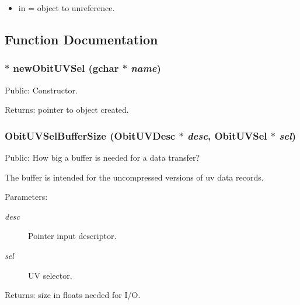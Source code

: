 \begin{itemize}
\item in = object to unreference. \end{itemize}


\subsection{Function Documentation}
\subsubsection{$\ast$ new\-Obit\-UVSel (gchar $\ast$ {\em name})}\label{ObitUVSel_8h_a4}


Public: Constructor. 

\begin{Desc}
\item[Returns:]pointer to object created. \end{Desc}
\subsubsection{ Obit\-UVSel\-Buffer\-Size ({\bf Obit\-UVDesc} $\ast$ {\em desc}, {\bf Obit\-UVSel} $\ast$ {\em sel})}\label{ObitUVSel_8h_a7}


Public: How big a buffer is needed for a data transfer? 

The buffer is intended for the uncompressed versions of uv data records. \begin{Desc}
\item[Parameters:]
\begin{description}
\item[{\em desc}]Pointer input descriptor. \item[{\em sel}]UV selector. \end{description}
\end{Desc}
\begin{Desc}
\item[Returns:]size in floats needed for I/O. \end{Desc}
